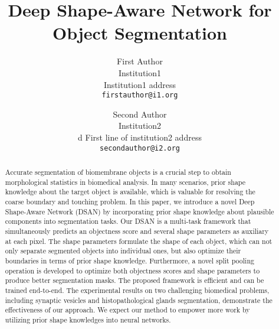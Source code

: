 \documentclass[10pt,twocolumn,letterpaper]{article}
\newcommand{\mdf}[1]{\textcolor[rgb]{0.00,0.00,1.00}{#1}}
\begin{document}
\title{Deep Shape-Aware Network for Object Segmentation} 

\author{First Author\\
Institution1\\
Institution1 address\\
{\tt\small firstauthor@i1.org}
\and
Second Author\\
Institution2\\d
First line of institution2 address\\
{\tt\small secondauthor@i2.org}
}

\maketitle


\begin{abstract}
   Accurate segmentation of biomembrane objects is a crucial step to obtain morphological statistics in biomedical analysis.
   \mdf{In many scenarios, prior shape knowledge about the target object is available, which is valuable for resolving the coarse boundary and touching problem.}
   In this paper, we introduce a novel Deep Shape-Aware Network (DSAN) by incorporating prior shape knowledge about plausible components into segmentation tasks.
   Our DSAN is a multi-task framework that simultaneously predicts an objectness score and several shape parameters as auxiliary at each pixel.
   The shape parameters formulate the shape of each object, which can not only separate segmented objects into individual ones, but also optimize their boundaries in terms of prior shape knowledge.
   Furthermore, a novel split pooling operation is developed to optimize both objectness scores and shape parameters to produce better segmentation masks.
   The proposed framework is efficient and can be trained end-to-end.
   The experimental results on two challenging biomedical problems, including synaptic vesicles and histopathological glands segmentation, demonstrate the effectiveness of our approach.
   We expect our method to empower more work by utilizing prior shape knowledges into neural networks.

\end{abstract}








{\small


}
\end{document}
